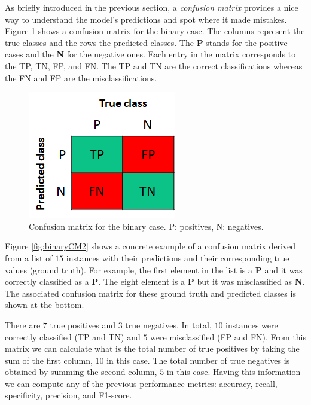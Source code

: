 \documentclass[
  11pt,
]{krantz}
\begin{document}
As briefly introduced in the previous section, a \emph{confusion matrix} provides a nice way to understand the model's predictions and spot where it made mistakes. Figure \ref{fig:binaryCM} shows a confusion matrix for the binary case. The columns represent the true classes and the rows the predicted classes. The \textbf{P} stands for the positive cases and the \textbf{N} for the negative ones. Each entry in the matrix corresponds to the TP, TN, FP, and FN. The TP and TN are the correct classifications whereas the FN and FP are the misclassifications.

\begin{figure}

{\centering \includegraphics[width=0.3\linewidth]{images/binaryCM} 

}

\caption{Confusion matrix for the binary case. P: positives, N: negatives.}\label{fig:binaryCM}
\end{figure}

Figure \ref{fig:binaryCM2} shows a concrete example of a confusion matrix derived from a list of \(15\) instances with their predictions and their corresponding true values (ground truth). For example, the first element in the list is a \textbf{P} and it was correctly classified as a \textbf{P}. The eight element is a \textbf{P} but it was misclassified as \textbf{N}. The associated confusion matrix for these ground truth and predicted classes is shown at the bottom.

There are \(7\) true positives and \(3\) true negatives. In total, \(10\) instances were correctly classified (TP and TN) and \(5\) were misclassified (FP and FN). From this matrix we can calculate what is the total number of true positives by taking the sum of the first column, \(10\) in this case. The total number of true negatives is obtained by summing the second column, \(5\) in this case. Having this information we can compute any of the previous performance metrics: accuracy, recall, specificity, precision, and F1-score.
\end{document}
